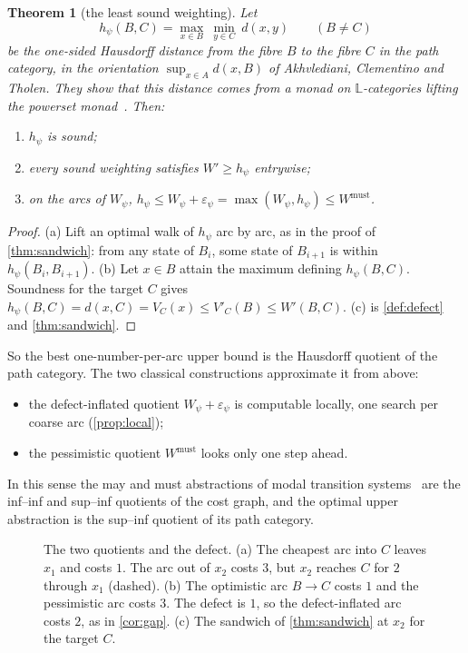 \documentclass[11pt]{article}
\newtheorem{theorem}{Theorem}[section]
\theoremstyle{definition}
\theoremstyle{remark}
\newcommand{\Lq}{\mathbb{L}}           %
\newcommand{\eps}{\varepsilon}
\newcommand{\dd}{d}
\newcommand{\Wm}{W^{\mathrm{must}}}
\begin{document}
\begin{theorem}[the least sound weighting]\label{thm:hausdorff}
Let
\[
h_\psi(B,C) = \max_{x \in B}\ \min_{y \in C}\ \dd(x,y) \qquad (B \ne C)
\]
be the one-sided Hausdorff distance from the fibre $B$ to the fibre $C$ in the
path category, in the orientation $\sup_{x\in A} \dd(x,B)$ of Akhvlediani,
Clementino and Tholen. They show that this distance comes from a monad on
$\Lq$-categories lifting the powerset monad~\cite{akhvlediani2010}. Then:
\begin{enumerate}[label=(\alph*),nosep]
\item $h_\psi$ is sound;
\item every sound weighting satisfies $W' \ge h_\psi$ entrywise;
\item on the arcs of $W_\psi$, $h_\psi \le W_\psi + \eps_\psi = \max(W_\psi, h_\psi)
  \le \Wm$.
\end{enumerate}
\end{theorem}
\begin{proof}
(a) Lift an optimal walk of $h_\psi$ arc by arc, as in the proof of
\cref{thm:sandwich}: from any state of $B_i$, some state of $B_{i+1}$ is within
$h_\psi(B_i,B_{i+1})$. (b) Let $x \in B$ attain the maximum defining $h_\psi(B,C)$.
Soundness for the target $C$ gives
$h_\psi(B,C) = \dd(x,C) = V_C(x) \le V'_C(B) \le W'(B,C)$. (c) is
\cref{def:defect} and \cref{thm:sandwich}.
\end{proof}

So the best one-number-per-arc upper bound is the Hausdorff quotient of the path
category. The two classical constructions approximate it from above:
\begin{itemize}[nosep]
\item the defect-inflated quotient $W_\psi + \eps_\psi$ is computable locally, one
  search per coarse arc (\cref{prop:local});
\item the pessimistic quotient $\Wm$ looks only one step ahead.
\end{itemize}
In this sense the may and must abstractions of modal transition
systems~\cite{larsen1988} are the inf--inf and sup--inf quotients of the cost
graph, and the optimal upper abstraction is the sup--inf quotient of its path
category.

\begin{figure}[t]
\centering

\caption{The two quotients and the defect. (a) The cheapest arc into $C$ leaves
$x_1$ and costs $1$. The arc out of $x_2$ costs $3$, but $x_2$ reaches $C$ for $2$
through $x_1$ (dashed). (b) The optimistic arc $B \to C$ costs $1$ and the
pessimistic arc costs $3$. The defect is $1$, so the defect-inflated arc costs
$2$, as in \cref{cor:gap}. (c) The sandwich of \cref{thm:sandwich} at $x_2$ for
the target $C$.}
\label{fig:quotients}
\end{figure}
\end{document}
